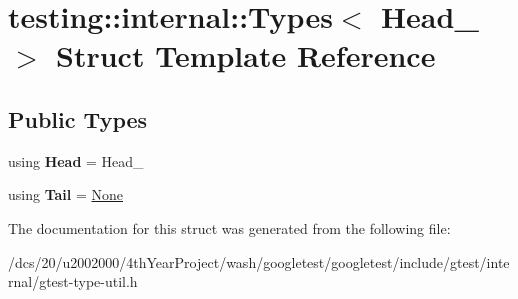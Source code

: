 \hypertarget{structtesting_1_1internal_1_1Types_3_01Head___01_4}{}\section{testing\+:\+:internal\+:\+:Types$<$ Head\+\_\+ $>$ Struct Template Reference}
\label{structtesting_1_1internal_1_1Types_3_01Head___01_4}
\subsection*{Public Types}
\begin{DoxyCompactItemize}
\item 
\mbox{\label{structtesting_1_1internal_1_1Types_3_01Head___01_4_acc643a692020fe60c80cf77fb984c04d}} 
using {\bfseries Head} = Head\+\_\+
\item 
\mbox{\label{structtesting_1_1internal_1_1Types_3_01Head___01_4_a744a032ef03e4446a6943b68fd3f94ee}} 
using {\bfseries Tail} = \mbox{\hyperlink{structtesting_1_1internal_1_1None}{None}}
\end{DoxyCompactItemize}


The documentation for this struct was generated from the following file\+:\begin{DoxyCompactItemize}
\item 
/dcs/20/u2002000/4th\+Year\+Project/wash/googletest/googletest/include/gtest/internal/gtest-\/type-\/util.\+h\end{DoxyCompactItemize}
